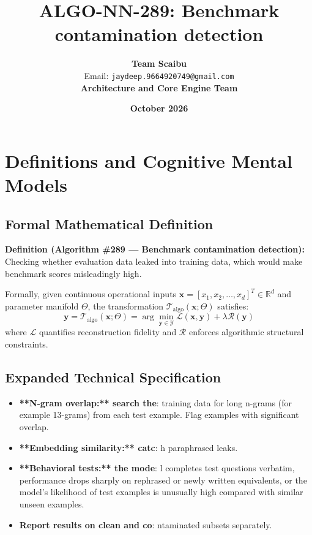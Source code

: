 \documentclass[11pt,a4paper]{article}
\title{\textbf{ALGO-NN-289: Benchmark contamination detection}}
\author{\textbf{Team Scaibu} \\ \small Email: \texttt{jaydeep.9664920749@gmail.com} \\ \small \textbf{Architecture and Core Engine Team}}
\date{\textbf{October 2026}}
\theoremstyle{definition}
\begin{document}
\maketitle

\section{Definitions and Cognitive Mental Models}

\subsection{Formal Mathematical Definition}
\textbf{Definition (Algorithm \#289 --- Benchmark contamination detection):}
Checking whether evaluation data leaked into training data, which would make benchmark scores misleadingly high.

Formally, given continuous operational inputs $\mathbf{x} = [x_1, x_2, \dots, x_d]^T \in \mathbb{R}^d$ and parameter manifold $\Theta$, the transformation $\mathcal{T}_{\text{algo}}(\mathbf{x}; \Theta)$ satisfies:
{\boldmath
\begin{equation}
\mathbf{y} = \mathcal{T}_{\text{algo}}(\mathbf{x}; \Theta) = \arg\min_{\mathbf{y} \in \mathcal{Y}} \mathcal{L}(\mathbf{x}, \mathbf{y}) + \lambda \mathcal{R}(\mathbf{y})
\end{equation}
}
where $\mathcal{L}$ quantifies reconstruction fidelity and $\mathcal{R}$ enforces algorithmic structural constraints.

\subsection{Expanded Technical Specification}
\begin{itemize}
\item \textbf{**N-gram overlap:** search the}:  training data for long n-grams (for example 13-grams) from each test example. Flag examples with significant overlap.
\item \textbf{**Embedding similarity:** catc}: h paraphrased leaks.
\item \textbf{**Behavioral tests:** the mode}: l completes test questions verbatim, performance drops sharply on rephrased or newly written equivalents, or the model's likelihood of test examples is unusually high compared with similar unseen examples.
\item \textbf{Report results on clean and co}: ntaminated subsets separately.
\end{itemize}
\end{document}
